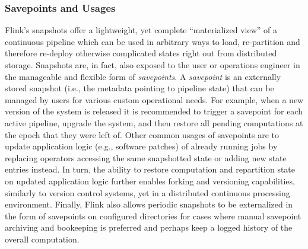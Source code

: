 \subsubsection{Savepoints and Usages}
\label{sec:savepoints}
Flink's snapshots offer a lightweight, yet complete ``materialized view'' of a continuous pipeline which can be used in arbitrary ways to load, re-partition and therefore re-deploy otherwise complicated states right out from distributed storage. Snapshots are, in fact, also exposed to the user or operations engineer in the manageable and flexible form of \emph{savepoints}. A \emph{savepoint} is an externally stored snapshot (i.e., the metadata pointing to pipeline state) that can be managed by users for various custom operational needs. For example, when a new version of the system is released it is recommended to trigger a savepoint for each active pipeline, upgrade the system, and then restore all pending computations at the epoch that they were left of. Other common usages of savepoints are to update application logic (e.g., software patches) of already running jobs by replacing operators accessing the same snapshotted state or adding new state entries instead. In turn, the ability to restore computation and repartition state on updated application logic further enables forking and versioning capabilities, similarly to version control systems, yet in a distributed continuous processing environment. Finally, Flink also allows periodic snapshots to be externalized in the form of savepoints on configured directories for cases where manual savepoint archiving and bookeeping is preferred and perhaps keep a logged history of the overall computation. 

